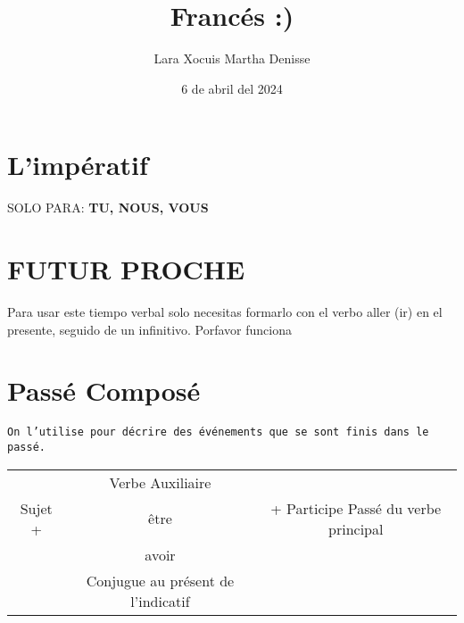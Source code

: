 \documentclass[letterpaper,12pt]{article}
\title {\textbf{Francés :)}}
\author{Lara Xocuis Martha Denisse}
\date{6 de abril del 2024}
\begin{document}
\maketitle
\thispagestyle{empty}
\newpage
\setcounter{page}{1}
\pagestyle{headings}

\begin{sloppypar} 
\section{L'impératif}

SOLO PARA: \textbf{TU, NOUS, VOUS} 


\section{FUTUR PROCHE}
Para usar este tiempo verbal solo necesitas formarlo con el verbo aller (ir) en el presente, seguido de un infinitivo. Porfavor funciona

\section{Passé Composé}
\texttt{On l'utilise pour décrire des événements que se sont finis dans le passé.}
\begin{center}
    \begin{tabular}{|c|c|c|}\hline
        & Verbe Auxiliaire & \\
        Sujet + & être & + Participe Passé du verbe principal\\
        & avoir & \\
        & Conjugue au présent de l'indicatif & \\
        \hline
    \end{tabular}
\end{center}


\end{sloppypar}
\end{document}
